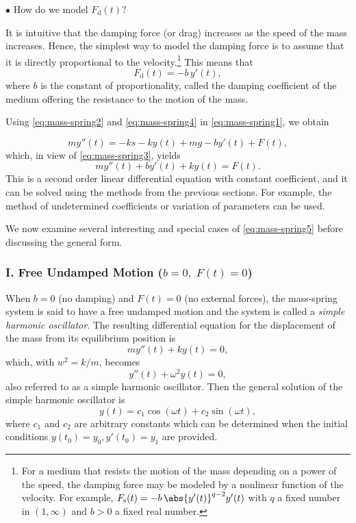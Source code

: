  \noindent$\bullet$ How do we model $F_{\text{d}}(t)?$
 
It is intuitive that the damping force (or drag) increases as the speed of the mass increases. Hence, the simplest way to model the damping force is to assume that it is directly proportional to the velocity.\footnote[2]{For a medium that resists the motion of the mass  depending on a power of the speed,  the damping force may be modeled by a nonlinear function of  the velocity. For example, \( F_{\text{s}}(t) = - b\,\abs{y'(t)}^{q-2}y'(t)\) with $q$ a fixed number in \((1, \infty)\) and $b>0$ a fixed real number.}
This means that 
\begin{equation}\label{eq:mass-spring4}
F_{\text{d}}(t)=  - b\, y'(t), \end{equation}
where 
$b$ is the constant of proportionality, called the damping coefficient of the medium offering the resistance to the motion of the mass.

Using \eqref{eq:mass-spring2} and \eqref{eq:mass-spring4} in \eqref{eq:mass-spring1}, we obtain

\[
	m y''(t) = -ks -k y(t) + mg- b y'(t) + F(t),
\] which, in view of \eqref{eq:mass-spring3}, yields
\begin{equation}\label{eq:mass-spring5}
	my''(t) + by'(t) + k y(t) = F(t).
\end{equation}
This is a second order linear differential equation with constant coefficient, and it can be solved using the methods from the previous sections. For example, the method of undetermined coefficients or variation of parameters can be used.

We now examine several interesting and special cases of \eqref{eq:mass-spring5} before  discussing the general form. 
 

\subsubsection{I. Free Undamped Motion ($b=0,\;F(t) =0$)}	
  When $b= 0$ (no damping) and $F(t) = 0$ (no external forces), the mass-spring system is said to have  a free undamped motion and the system  is called a \textit{simple harmonic oscillator}.   The resulting differential equation for the displacement of the mass from its equilibrium position is 
	\[	my''(t)  + k y(t) = 0,\] which, with $w^2 = k/m$,  becomes
	\begin{equation}\label{eq:mass-spring6}
		y''(t) + \omega^2 y(t) = 0,
		\end{equation}
	also referred to as a simple harmonic oscillator.
	Then the general solution of the simple harmonic oscillator is 
	\begin{equation}\label{eq:mass-spring7}
		y(t) = c_1 \cos(\omega t) + c_2 \sin(\omega t),
		\end{equation} where $c_1$ and $c_2$ are arbitrary constants  which can be determined when the initial conditions $y(t_0) = y_0,  y'(t_0) = y_1$ are  provided.
	
